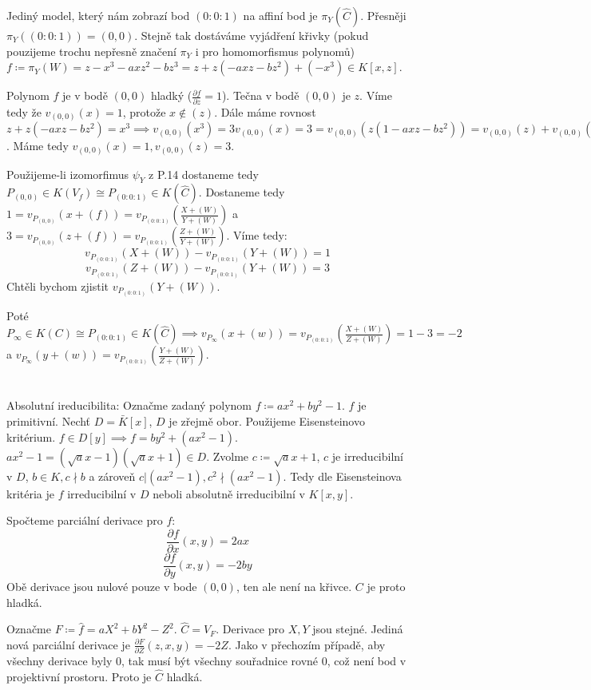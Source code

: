 \documentclass[12pt, a4paper]{article}
\begin{document}
Jediný model, který nám zobrazí bod $(0:0:1)$ na affiní bod je $\pi_Y(\hat{C})$. Přesněji $\pi_Y((0:0:1))=(0,0)$. Stejně tak dostáváme vyjádření křivky (pokud pouzijeme trochu nepřesně značení $\pi_Y$ i pro homomorfismus polynomů) $f \coloneqq \pi_Y(W) = z - x^3 - axz^2 - bz^3 = z + z(-axz - bz^2) + (-x^3) \in K[x,z]$.

Polynom $f$ je v bodě $(0,0)$ hladký ($\frac{\partial f}{\partial z} = 1$). Tečna v bodě $(0,0)$ je $z$. Víme tedy že $v_{(0,0)}(x) = 1$, protože $x \notin (z)$. Dále máme rovnost $z + z(-axz - bz^2) = x^3 \implies v_{(0,0)}(x^3) = 3v_{(0,0)}(x) = 3 = v_{(0,0)}(z(1 -axz - bz^2)) = v_{(0,0)}(z) + v_{(0,0)}(1 -axz - bz^2) = v_{(0,0)}(z)$. Máme tedy $v_{(0,0)}(x)=1, v_{(0,0)}(z) = 3$.

Použijeme-li izomorfimus $\psi_Y$ z P.14 dostaneme tedy $P_{(0,0)} \in K(V_f) \cong P_{(0:0:1)} \in K(\hat{C})$. Dostaneme tedy $1 = v_{P_{(0,0)}}(x+(f)) = v_{P_{(0:0:1)}}(\frac{X+(W)}{Y+(W)})$ a $3 = v_{P_{(0,0)}}(z+(f)) = v_{P_{(0:0:1)}}(\frac{Z+(W)}{Y+(W)})$. Víme tedy:
\[
v_{P_{(0:0:1)}}(X+(W)) - v_{P_{(0:0:1)}}({Y+(W)}) = 1
\]
\[
v_{P_{(0:0:1)}}(Z+(W)) - v_{P_{(0:0:1)}}({Y+(W)}) = 3
\]
Chtěli bychom zjistit $v_{P_{(0:0:1)}}(Y+(W))$.

Poté $P_{\infty} \in K(C) \cong P_{(0:0:1)} \in K(\hat{C}) \implies v_{P_\infty}(x+(w)) = v_{P_{(0:0:1)}}(\frac{X+(W)}{Z+(W)}) = 1 - 3 = -2$ a $v_{P_\infty}(y+(w)) = v_{P_{(0:0:1)}}(\frac{Y+(W)}{Z+(W)})$.
\section{}
Absolutní ireducibilita: Označme zadaný polynom $f \coloneqq ax^2+by^2-1$. $f$ je primitivní. Nechť $D = \bar{K}[x]$, $D$ je zřejmě obor. Použijeme Eisensteinovo kritérium. $f \in D[y] \implies f = by^2 + (ax^2-1)$. $ax^2-1 = (\sqrt{a}x-1)(\sqrt{a}x+1) \in D$. Zvolme $c \coloneqq \sqrt{a}x+1$, $c$ je irreducibilní v $D$,  $b \in K, c \nmid b$ a zároveň $c | (ax^2-1), c^2 \nmid (ax^2-1)$. Tedy dle Eisensteinova kritéria je $f$ irreducibilní v $D$ neboli absolutně irreducibilní v $K[x,y]$.

Spočteme parciální derivace pro $f$:
\[
\frac{\partial f}{\partial x}(x,y) = 2ax
\]
\[
\frac{\partial f}{\partial y}(x,y) = -2by
\]
Obě derivace jsou nulové pouze v bode $(0,0)$, ten ale není na křivce. $C$ je proto hladká.

Označme $F \coloneqq \hat{f} = aX^2+bY^2-Z^2$. $\hat{C} = V_F$.  Derivace pro $X,Y$ jsou stejné. Jediná nová parciální derivace je $\frac{\partial F}{\partial Z}(z,x,y) = -2Z$. Jako v přechozím případě, aby všechny derivace byly 0, tak musí být všechny souřadnice rovné 0, což není bod v projektivní prostoru. Proto je $\hat{C}$ hladká.
\end{document}
